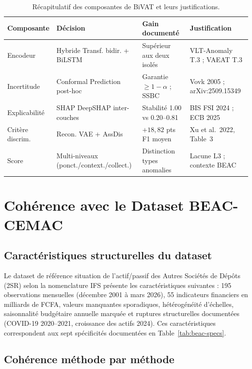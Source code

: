 \documentclass[12pt,a4paper]{article}
\begin{document}
\begin{table}[ht]
\centering
\caption{Récapitulatif des composantes de BiVAT et leurs justifications.}
\label{tab:bivat-recap}
\small
\begin{tabular}{p{3cm}p{4cm}p{3.5cm}p{4cm}}
\toprule
\textbf{Composante} & \textbf{Décision} &
\textbf{Gain documenté} & \textbf{Justification} \\
\midrule
Encodeur & Hybride Transf. bidir. + BiLSTM &
Supérieur aux deux isolés &
VLT-Anomaly T.3 ; VAEAT T.3 \\
\midrule
Incertitude & Conformal Prediction post-hoc &
Garantie $\geq 1-\alpha$ ; SSBC &
Vovk 2005 ; arXiv:2509.15349 \\
\midrule
Explicabilité & SHAP DeepSHAP inter-couches &
Stabilité 1.00 vs 0.20--0.81 &
BIS FSI 2024 ; ECB 2025 \\
\midrule
Critère discrim. & Recon. VAE + AssDis &
$+18{,}82$ pts F1 moyen &
Xu et al.\ 2022, Table~3 \\
\midrule
Score & Multi-niveaux (ponct./context./collect.) &
Distinction types anomalies &
Lacune L3 ; contexte BEAC \\
\bottomrule
\end{tabular}
\end{table}

\section{Cohérence avec le Dataset BEAC-CEMAC}

\subsection{Caractéristiques structurelles du dataset}

Le dataset de référence  situation de l'actif/passif des Autres Sociétés de
Dépôts (2SR) selon la nomenclature IFS  présente les caractéristiques
suivantes : 195 observations mensuelles (décembre 2001 à mars 2026), 55
indicateurs financiers en milliards de FCFA, valeurs manquantes sporadiques,
hétérogénéité d'échelles, saisonnalité budgétaire annuelle marquée et ruptures
structurelles documentées (COVID-19 2020--2021, croissance des actifs 2024).
Ces caractéristiques correspondent aux sept spécificités documentées en
Table~\ref{tab:beac-specs}.

\subsection{Cohérence méthode par méthode}
\end{document}
